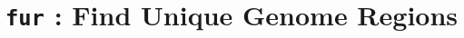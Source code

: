 

\pagestyle{noweb}

\title{\texttt{fur} : Find Unique Genome Regions}
\author{}
\maketitle

\tableofcontents





